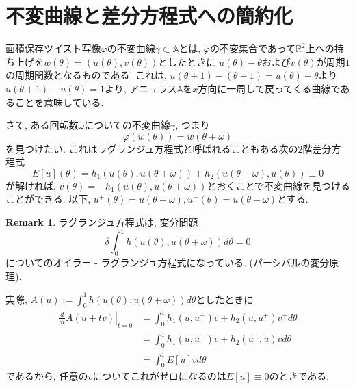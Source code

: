 \documentclass[a4paper]{ujarticle}
\numberwithin{equation}{section}
\theoremstyle{definition}
\newtheorem{remark}{Remark}
\begin{document}
    \section{不変曲線と差分方程式への簡約化}
        面積保存ツイスト写像$\varphi$の不変曲線$\gamma \subset \mathbb{A}$とは, 
        $\varphi$の不変集合であって$\mathbb{R}^2$上への持ち上げを$w(\theta) = (u(\theta), v(\theta))$としたときに
        $u(\theta) - \theta$および$v(\theta)$が周期$1$の周期関数となるものである.
        これは, $u(\theta + 1) - (\theta + 1) = u(\theta) - \theta$より$u(\theta + 1) - u(\theta) = 1$より, 
        アニュラス$\mathbb{A}$を$x$方向に一周して戻ってくる曲線であることを意味している.
        
        さて, ある回転数$\omega$についての不変曲線$\gamma$, つまり
        \[
                \varphi(w(\theta)) = w(\theta + \omega)
        \]
        を見つけたい. これはラグランジュ方程式と呼ばれることもある次の$2$階差分方程式
        \begin{equation} \label{eq:3}
            E[u](\theta) = h_1(u(\theta), u(\theta + \omega)) + h_2(u(\theta - \omega), u(\theta)) \equiv 0
        \end{equation}
        が解ければ, $v(\theta) = - h_1(u(\theta), u(\theta + \omega))$とおくことで不変曲線を見つけることができる.
        以下, $u^{+}(\theta) = u(\theta + \omega), u^{-}(\theta) = u(\theta - \omega)$とする.

        \begin{remark}
            ラグランジュ方程式は, 変分問題
            \[
                \delta \int^1_0 h(u(\theta), u(\theta + \omega)) d \theta = 0
            \]
            についてのオイラー - ラグランジュ方程式になっている. (パーシバルの変分原理).

            実際, $\displaystyle A(u) := \int^1_0 h(u(\theta), u(\theta + \omega)) d \theta$としたときに
            \begin{align}
                \left. \frac{d}{d t} A(u + t v) \right|_{t = 0} &= \int^1_0 h_{1}(u, u^{+})v + h_{2}(u, u^{+}) v^{+} d \theta \\
                &= \int^1_0 h_{1}(u, u^{+})v + h_{2}(u^{-}, u) v d \theta \\
                &= \int^1_0 E[u] v d \theta
            \end{align}
            であるから, 任意の$v$についてこれがゼロになるのは$E[u] \equiv 0$のときである.

        \end{remark}
\end{document}
